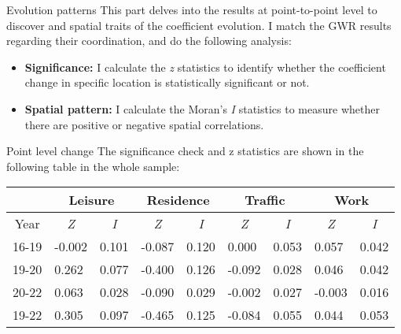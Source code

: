 \documentclass[aspectratio=169,xcolor=dvipsnames]{beamer}
\begin{document}
\begin{frame}{Evolution patterns}
	This part delves into the results at point-to-point level to discover and spatial traits of the coefficient evolution. I match the GWR results regarding their coordination, and do the following analysis:
	\begin{itemize}
\item \textbf{Significance:} I calculate the \textit{z} statistics to identify whether the coefficient change in specific location is statistically significant or not.
\item \textbf{Spatial pattern: }I calculate the Moran's \textit{I} statistics to measure whether there are positive or negative spatial correlations.
	\end{itemize}
\end{frame}
\begin{frame}{Point level change}
	The significance check and z statistics are shown in the following table in the whole sample:
	\begin{table}[]
		\begin{tabular}{l|ll|ll|ll|ll}\toprule 
			& \multicolumn{2}{c|}{Leisure}                                     & \multicolumn{2}{c|}{Residence}                                   & \multicolumn{2}{c|}{Traffic}                                     & \multicolumn{2}{c}{Work}                                        \\\midrule
			\multicolumn{1}{c|}{Year} & \multicolumn{1}{c}{\textit{Z}} & \multicolumn{1}{c|}{\textit{I}} & \multicolumn{1}{c}{\textit{Z}} & \multicolumn{1}{c|}{\textit{I}} & \multicolumn{1}{c}{\textit{Z}} & \multicolumn{1}{c|}{\textit{I}} & \multicolumn{1}{c}{\textit{Z}} & \multicolumn{1}{c}{\textit{I}} \\\hline 
			16-19                    & -0.002                         & 0.101                          & -0.087                         & 0.120                          & 0.000                          & 0.053                          & 0.057                          & 0.042                          \\
			19-20                    & 0.262                          & 0.077                          & -0.400                         & 0.126                          & -0.092                         & 0.028                          & 0.046                          & 0.042                          \\
			20-22                    & 0.063                          & 0.028                          & -0.090                         & 0.029                          & -0.002                         & 0.027                          & -0.003                         & 0.016                          \\
			19-22                    & 0.305                          & 0.097                          & -0.465                         & 0.125                          & -0.084                         & 0.055                          & 0.044                          & 0.053               \\\bottomrule          
		\end{tabular}
	\end{table}
\end{frame}
\end{document}

